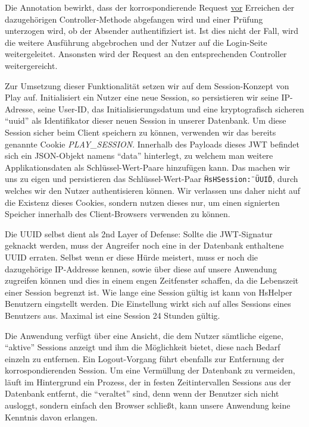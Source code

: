 \documentclass[12pt,DIV14,BCOR10mm,a4paper,parskip=half-,headsepline,headinclude,english,ngerman,bibliography=totocnumbered]{scrreprt}
\begin{document}
Die Annotation bewirkt, dass der korrospondierende Request \underline{vor} Erreichen der dazugehörigen Controller-Methode abgefangen wird und einer Prüfung unterzogen wird, ob der Absender authentifiziert ist. Ist dies nicht der Fall, wird die weitere Ausführung abgebrochen und der Nutzer auf die Login-Seite weitergeleitet. Ansonsten wird der Request an den entsprechenden Controller weitergereicht.

Zur Umsetzung dieser Funktionalität setzen wir auf dem Session-Konzept von Play auf.
Initialisiert ein Nutzer eine neue Session, so persistieren wir seine IP-Adresse, seine User-ID, das Initialisierungsdatum und eine kryptografisch sicheren \enquote{\gls{uuid}} als Identifikator dieser neuen Session in unserer Datenbank. \linebreak
Um diese Session sicher beim Client speichern zu können, verwenden wir das bereits genannte Cookie \textit{PLAY\_SESSION}.
Innerhalb des Payloads dieses JWT befindet sich ein JSON-Objekt namens \enquote{data} hinterlegt, zu welchem man weitere Applikationsdaten als Schlüssel-Wert-Paare hinzufügen kann.
Das machen wir uns zu eigen und persistieren das Schlüssel-Wert-Paar \texttt{\"HsHSession\": \"UUID\"}, durch welches wir den Nutzer authentisieren können.
Wir verlassen uns daher nicht auf die Existenz dieses Cookies, sondern nutzen dieses nur, um einen signierten Speicher innerhalb des Client-Browsers verwenden zu können.

Die UUID selbst dient als 2nd Layer of Defense: Sollte die JWT-Signatur geknackt werden, muss der Angreifer noch eine in der Datenbank enthaltene UUID erraten. Selbst wenn er diese Hürde meistert, muss er noch die dazugehörige IP-Addresse kennen, sowie über diese auf unsere Anwendung zugreifen können und dies in einem engen Zeitfenster schaffen, da die Lebenszeit einer Session begrenzt ist. Wie lange eine Session gültig ist kann von HsHelper Benutzern eingstellt werden. Die Einstellung wirkt sich auf alles Sessions eines Benutzers aus. Maximal ist eine Session 24 Stunden gültig.

Die Anwendung verfügt über eine Ansicht, die dem Nutzer sämtliche eigene, \enquote{aktive} Sessions anzeigt und ihm die Möglichkeit bietet, diese nach Bedarf einzeln zu entfernen. Ein Logout-Vorgang führt ebenfalls zur Entfernung der korrospondierenden Session. Um eine Vermüllung der Datenbank zu vermeiden, läuft im Hintergrund ein Prozess, der in festen Zeitintervallen Sessions aus der Datenbank entfernt, die \enquote{veraltet} sind, denn wenn der Benutzer sich nicht ausloggt, sondern einfach den Browser schließt, kann unsere Anwendung keine Kenntnis davon erlangen.
\end{document}
